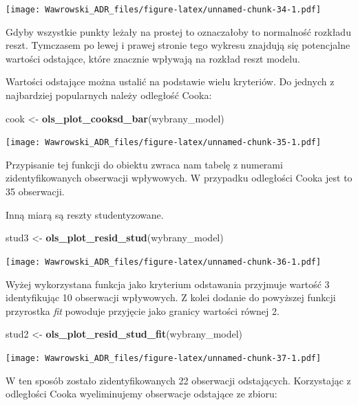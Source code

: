 \documentclass[
]{book}
\newenvironment{Shaded}{\begin{snugshade}}{\end{snugshade}}
\newcommand{\KeywordTok}[1]{\textcolor[rgb]{0.13,0.29,0.53}{\textbf{#1}}}
\newcommand{\NormalTok}[1]{#1}
\newcommand{\StringTok}[1]{\textcolor[rgb]{0.31,0.60,0.02}{#1}}
\begin{document}
\texttt{[image: Wawrowski\_ADR\_files/figure-latex/unnamed-chunk-34-1.pdf]}

Gdyby wszystkie punkty leżały na prostej to oznaczałoby to normalność rozkładu reszt. Tymczasem po lewej i prawej stronie tego wykresu znajdują się potencjalne wartości odstające, które znacznie wpływają na rozkład reszt modelu.

Wartości odstające można ustalić na podstawie wielu kryteriów. Do jednych z najbardziej popularnych należy odległość Cooka:

\begin{Shaded}
\begin{Highlighting}[]
\NormalTok{cook <-}\StringTok{ }\KeywordTok{ols_plot_cooksd_bar}\NormalTok{(wybrany_model)}
\end{Highlighting}
\end{Shaded}

\texttt{[image: Wawrowski\_ADR\_files/figure-latex/unnamed-chunk-35-1.pdf]}

Przypisanie tej funkcji do obiektu zwraca nam tabelę z numerami zidentyfikowanych obserwacji wpływowych. W przypadku odległości Cooka jest to 35 obserwacji.

Inną miarą są reszty studentyzowane.

\begin{Shaded}
\begin{Highlighting}[]
\NormalTok{stud3 <-}\StringTok{ }\KeywordTok{ols_plot_resid_stud}\NormalTok{(wybrany_model)}
\end{Highlighting}
\end{Shaded}

\texttt{[image: Wawrowski\_ADR\_files/figure-latex/unnamed-chunk-36-1.pdf]}

Wyżej wykorzystana funkcja jako kryterium odstawania przyjmuje wartość 3 identyfikując 10 obserwacji wpływowych. Z kolei dodanie do powyższej funkcji przyrostka \emph{fit} powoduje przyjęcie jako granicy wartości równej 2.

\begin{Shaded}
\begin{Highlighting}[]
\NormalTok{stud2 <-}\StringTok{ }\KeywordTok{ols_plot_resid_stud_fit}\NormalTok{(wybrany_model)}
\end{Highlighting}
\end{Shaded}

\texttt{[image: Wawrowski\_ADR\_files/figure-latex/unnamed-chunk-37-1.pdf]}

W ten sposób zostało zidentyfikowanych 22 obserwacji odstających. Korzystając z odległości Cooka wyeliminujemy obserwacje odstające ze zbioru:
\end{document}
